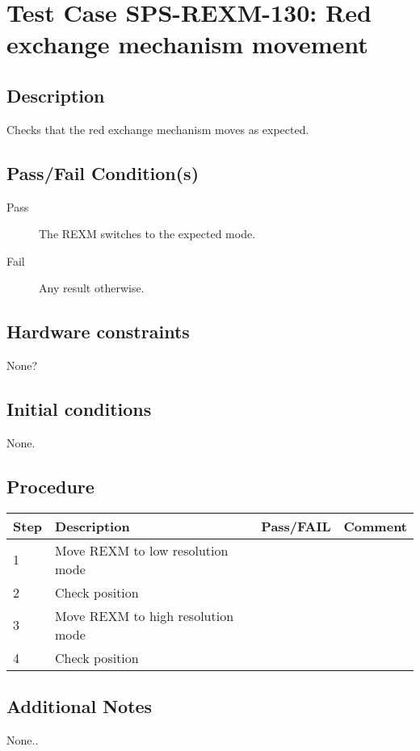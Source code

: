 \section{Test Case SPS-REXM-130: Red exchange mechanism movement}

\subsection{Description}

Checks that the red exchange mechanism moves as expected.

\subsection{Pass/Fail Condition(s)}

\begin{description}
\item [Pass] The REXM switches to the expected mode.
\item [Fail] Any result otherwise. 
\end{description}

\subsection{Hardware constraints}

None?

\subsection{Initial conditions}

None.

\subsection{Procedure}

\begin{table}[H]
    \begin{tabular}{|l| p{5cm} |l| p{5cm} |}
    \hline
    {\bf Step} & {\bf Description} & {\bf Pass/FAIL} & {\bf Comment}  \\ \hline
    1 & Move REXM to low resolution mode &  &  \\ \hline
    2 & Check position &  &  \\ \hline
    3 & Move REXM to high resolution mode &  &  \\ \hline
    4 & Check position &  &  \\ \hline
    \end{tabular}
\end{table}


\subsection{Additional Notes}

None..
